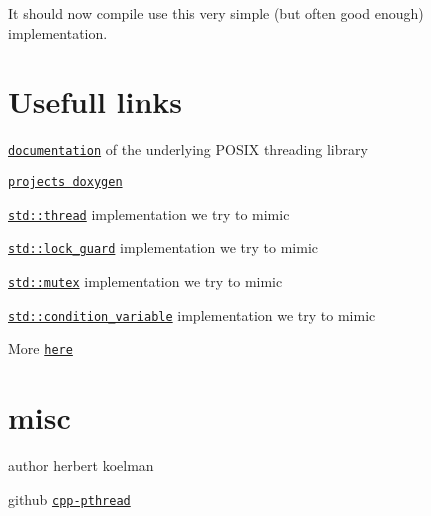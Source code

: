It should now compile use this very simple (but often good enough) implementation.

\section*{Usefull links}


\begin{DoxyItemize}
\item \href{http://pubs.opengroup.org/onlinepubs/007908799/xsh/threads.html}{\tt documentation} of the underlying P\+O\+S\+IX threading library
\item \href{http://herbertkoelman.github.io/cpp-pthread/doc/html/}{\tt project\textquotesingle{}s doxygen}
\item \href{http://en.cppreference.com/w/cpp/thread/thread}{\tt std\+::thread} implementation we try to mimic
\item \href{http://en.cppreference.com/w/cpp/thread/lock_guard/lock_guard}{\tt std\+::lock\+\_\+guard} implementation we try to mimic
\item \href{http://en.cppreference.com/w/cpp/thread/mutex}{\tt std\+::mutex} implementation we try to mimic
\item \href{http://en.cppreference.com/w/cpp/thread/condition_variable}{\tt std\+::condition\+\_\+variable} implementation we try to mimic
\end{DoxyItemize}

More \href{https://github.com/HerbertKoelman/cpp-pthread/wiki}{\tt here}

\section*{misc}


\begin{DoxyItemize}
\item author herbert koelman
\item github \href{https://github.com/HerbertKoelman/cpp-pthread}{\tt cpp-\/pthread} 
\end{DoxyItemize}